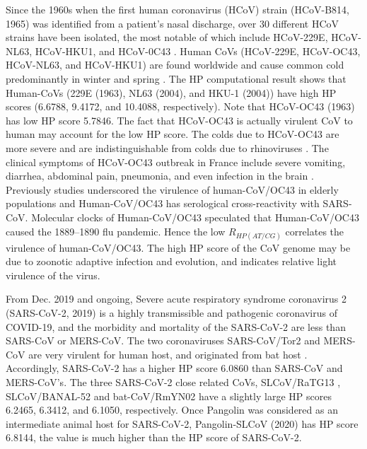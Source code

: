 \documentclass{article}
\numberwithin{equation}{section}
\begin{document}
Since the 1960s when the first human coronavirus (HCoV) strain (HCoV-B814, 1965) was identified from a patient’s nasal discharge, over 30 different HCoV strains have been isolated, the most notable of which include HCoV-229E, HCoV-NL63, HCoV-HKU1, and HCoV-0C43 \citep{ye2020zoonotic}. Human CoVs (HCoV-229E, HCoV-OC43, HCoV-NL63, and HCoV-HKU1) are found worldwide and cause common cold predominantly in winter and spring \citep{poutanen2018human}. The HP computational result shows that Human-CoVs (229E (1963), NL63 (2004), and HKU-1 (2004)) have high HP scores (6.6788, 9.4172, and 10.4088, respectively). Note that HCoV-OC43 (1963) has low HP score 5.7846. The fact that HCoV-OC43 is actually virulent CoV to human may account for the low HP score. The colds due to HCoV-OC43 are more severe and are indistinguishable from colds due to rhinoviruses \citep{poutanen2018human}. The clinical symptoms of HCoV-OC43 outbreak in France include severe vomiting, diarrhea, abdominal pain, pneumonia, and even infection in the brain \citep{vabret2003outbreak}. Previously studies underscored the virulence of human-CoV/OC43 in elderly populations \citep{patrick2006outbreak} and Human-CoV/OC43 has serological cross-reactivity with SARS-CoV. Molecular clocks of Human-CoV/OC43 speculated that Human-CoV/OC43 caused the 1889–1890 flu pandemic\citep{vijgen2005complete}. Hence the low $R_{HP(AT/CG)}$ correlates the virulence of human-CoV/OC43. The high HP score of the CoV genome may be due to zoonotic adaptive infection and evolution, and indicates relative light virulence of the virus. 

From Dec. 2019 and ongoing, Severe acute respiratory syndrome coronavirus 2 (SARS-CoV-2, 2019) is a highly transmissible and pathogenic coronavirus of COVID-19, and the morbidity and mortality of the SARS-CoV-2 are less than SARS-CoV or MERS-CoV. The two coronaviruses SARS-CoV/Tor2 and MERS-CoV are very virulent for human host, and originated from bat host \citep{hemida2014mers}. Accordingly, SARS-CoV-2 has a higher HP score 6.0860 than SARS-CoV and MERS-CoV's. The three SARS-CoV-2 close related CoVs, SLCoV/RaTG13 \citep{zhou2020pneumonia}, SLCoV/BANAL-52 \citep{temmam2021coronaviruses} and bat-CoV/RmYN02 \citep{zhou2021identification} have a slightly large HP scores 6.2465, 6.3412, and 6.1050, respectively. Once Pangolin was considered as an intermediate animal host for SARS-CoV-2, Pangolin-SLCoV (2020) \citep{lam2020identifying} has HP score 6.8144, the value is much higher than the HP score of SARS-CoV-2. 
\end{document}
